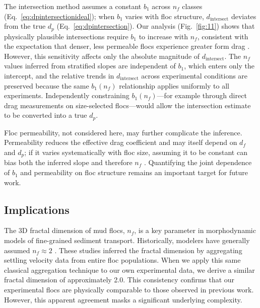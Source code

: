 \documentclass{agujournal2019}
\begin{document}
The intersection method assumes a constant $b_1$ across $n_f$ classes (Eq.~\eqref{eq:dpintersectionideal}); when $b_1$ varies with floc structure, $d_\text{intersect}$ deviates from the true $d_p$ (Eq.~\eqref{eq:dpintersection}). Our analysis (Fig.~\ref{fig:11}) shows that physically plausible intersections require $b_1$ to increase with $n_f$, consistent with the expectation that denser, less permeable flocs experience greater form drag \cite{strom2011explicit}. However, this sensitivity affects only the absolute magnitude of $d_\text{intersect}$. The $n_f$ values inferred from stratified slopes are independent of $b_1$, which enters only the intercept, and the relative trends in $d_\text{intersect}$ across experimental conditions are preserved because the same $b_1(n_f)$ relationship applies uniformly to all experiments. Independently constraining $b_1(n_f)$---for example through direct drag measurements on size-selected flocs---would allow the intersection estimate to be converted into a true $d_p$. 

Floc permeability, not considered here, may further complicate the inference. Permeability reduces the effective drag coefficient and may itself depend on $d_f$ and $d_p$; if it varies systematically with floc size, assuming it to be constant can bias both the inferred slope and therefore $n_f$ \cite{nghiem2024testing}. Quantifying the joint dependence of $b_1$ and permeability on floc structure remains an important target for future work.

\subsection{Implications}
The 3D fractal dimension of mud flocs, $n_f$, is a key parameter in morphodynamic models of fine-grained sediment transport. Historically, modelers have generally assumed $n_f \approx 2$ \cite{kranenburg1994fractal, son2008flocculation, winterwerp1998simple, winterwerp2004introduction}. These studies inferred the fractal dimension by aggregating settling velocity data from entire floc populations. When we apply this same classical aggregation technique to our own experimental data, we derive a similar fractal dimension of approximately 2.0. This consistency confirms that our experimental flocs are physically comparable to those observed in previous work. However, this apparent agreement masks a significant underlying complexity. 
\end{document}
